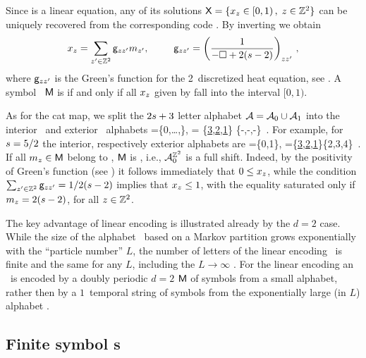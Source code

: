 \documentclass[12pt]{iopart}
\begin{document}
Since  is a linear equation, any of its solutions
\(\mathsf{X}= \{x_{z} \in [0,1) \,,\; z\in \mathbb{Z}^2 \}\) can be
uniquely recovered from the corresponding code \Mm.
By inverting  we obtain
\begin{equation}
  x_{z}=\sum_{z'\in\mathbb{Z}^2}\mathsf{g}_{z z'} {m_{z'}}, \hspace*{25pt}  \mathsf{g}_{z z' }
       =\left(\frac{1}{-\Box +2(s-2)}\right)_{zz'}
       \,,
\label{GreenFuncCoupled}
 \end{equation}
where $\mathsf{g}_{z z'}$ is the Green's function for the 2\dmn\ discretized heat
equation, see . A symbol \brick\ $\mathsf{M}$ is
{\admissible} if and only if all $x_{z}$ given by
 fall into the interval $[0,1)$.

As for the {cat map}, we split the $2s+3$ letter alphabet $\mathcal{A}=\mathcal{A}_0\cup\mathcal{A}_1$
into the interior \Ai\ and exterior \Ae\ alphabets
\beq
  \Ai=\{0,\dots,\},   \quad
  \Ae=
\{\underline{3},\underline{2},\underline{1}\}\cup
\{\!-,\!-,\!-\}
\,.
For example, for $s=5/2$ the interior, respectively exterior alphabets are
\beq
  \Ai=\{0,1\},   \quad
  \Ae=\{\underline{3},\underline{2},\underline{1}\}\cup \{2,3,4\}
\,.
If all ${m_{z}}\in \mathsf{M}$ belong to \Ai, $\mathsf{M}$ is
{\admissible}, i.e., $\mathcal{A}_0^{\mathbb{Z}^2}$ is a full shift.
Indeed, by the positivity of Green's function (see )
it follows immediately that $0 \leq x_{z}$, while the condition
$\sum_{z'\in \mathbb{Z}^2}\mathsf{g}_{zz'}=1/2({s}-2)$ implies that $x_z\leq 1$,
with the equality saturated only if ${m_{z}}=2({s}-2)$, for all
$z\in \mathbb{Z}^2$.

The key advantage of linear encoding is illustrated already by the $d=2$
case. While the size of the alphabet \Aa\ based on a Markov partition
grows exponentially with the ``particle number'' $L$, the number of
letters  of the linear encoding \A\ is finite and the same
for any $L$, including the $L\to\infty$ \catlatt. For the linear encoding an
\twot\ is encoded by a doubly periodic $d=2$ {\brick} $\mathsf{M}$ of symbols
from a small alphabet, rather then by a $1$\dmn\ temporal string of
symbols from the exponentially large (in $L$) alphabet \Aa.


\subsection{Finite symbol \brick s}
\label{sect:CCMmeasBrick}
\end{document}
